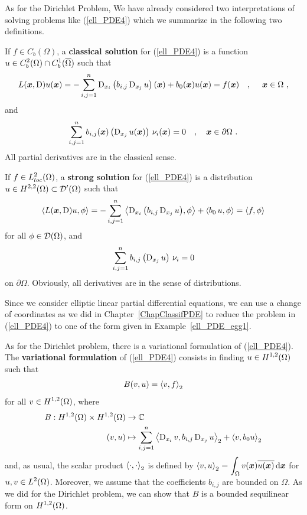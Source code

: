 As for the Dirichlet Problem, We have already considered two
interpretations of solving problems like (\ref{ell_PDE4}) which we summarize
in the following two definitions.

\begin{defn}
If $f \in C_b(\Omega)$, a {\bfseries classical solution}
 for
(\ref{ell_PDE4}) is a function
$\displaystyle u \in C^2_b(\Omega) \cap C^1_b(\overline{\Omega})$ such that
\[
L({\bm{x}}, \operatorname{D})u({\bm{x}}) = -\sum_{i,j=1}^n
\operatorname{D}_{x_i} \left( b_{i,j} \operatorname{D}_{x_j} u \right)({\bm{x}})
+ b_0({\bm{x}}) u({\bm{x}}) = f({\bm{x}}) \quad , \quad \ {\bm{x}} \in \Omega \ ,
\]
and
\[
\sum_{i,j=1}^n b_{i,j}(\VEC{x}) \left( \diff_{x_j} u(\VEC{x}) \right)
\, \nu_i(\VEC{x})= 0  \quad , \quad \VEC{x} \in \partial \Omega \ .
\]
All partial derivatives are in the classical sense.
\end{defn}

\begin{defn}
If $\displaystyle f\in L_{loc}^2(\Omega)$, a {\bfseries strong solution}
 for
(\ref{ell_PDE4}) is a distribution
$\displaystyle u \in H^{2,2}(\Omega) \subset \mathcal{D}'(\Omega)$ such that
\[
\left\langle{ L({\bm{x}},\operatorname{D})u} , {\phi}\right\rangle = -\sum_{i,j=1}^n
\left\langle{\operatorname{D}_{x_i}\left( b_{i,j} \operatorname{D}_{x_j} u \right)} , {\phi}\right\rangle
+ \left\langle{b_0 \, u} , {\phi}\right\rangle = \left\langle{f} , {\phi}\right\rangle
\]
for all $\displaystyle \phi \in \mathcal{D}(\Omega)$, and
\[
\sum_{i,j=1}^n b_{i,j} \left( \operatorname{D}_{x_j} u \right)\, \nu_i= 0
\]
on $\partial \Omega$.  Obviously, all derivatives
are in the sense of distributions.
\end{defn}

Since we consider elliptic linear partial differential equations, we
can use a change of coordinates as we did
in Chapter~\ref{ChapClassifPDE} to reduce the problem in
(\ref{ell_PDE4}) to one of the form given in
Example~\ref{ell_PDE_egg1}.

As for the Dirichlet problem, there is a variational formulation of
(\ref{ell_PDE4}).  The {\bfseries variational formulation} of
(\ref{ell_PDE4}) consists in finding
$\displaystyle u\in H^{1,2}(\Omega)$ such that
\begin{equation} \label{ell_PDE5}
B(v,u) = \left\langle{v} , {f}\right\rangle_2
\end{equation}
for all $\displaystyle v \in H^{1,2}(\Omega)$, where
\begin{equation} \label{ell_PDE6}
\begin{split}
B : H^{1,2}(\Omega) \times H^{1,2}(\Omega) & \rightarrow \mathbb{C} \\
(v,u) &\mapsto
\sum_{i,j=1}^n \left\langle{\operatorname{D}_{x_i} v} , {b_{i,j} \operatorname{D}_{x_j} u}\right\rangle_2 + \left\langle{v} , {b_0 u}\right\rangle_2
\end{split}
\end{equation}
and, as usual, the scalar product $\left\langle{\cdot} , {\cdot}\right\rangle_2$ is defined by
$\displaystyle \left\langle{v} , {u}\right\rangle_2
= \int_\Omega v({\bm{x}})\overline{u({\bm{x}})} \,\mathrm{d}{{\bm{x}}}$ for
$\displaystyle u,v \in L^2(\Omega)$.
Moreover, we assume that the coefficients $b_{i,j}$ are
bounded on $\Omega$.  As we did for the Dirichlet problem, we can show
that $B$ is a bounded sequilinear form on $\displaystyle H^{1,2}(\Omega)$.

